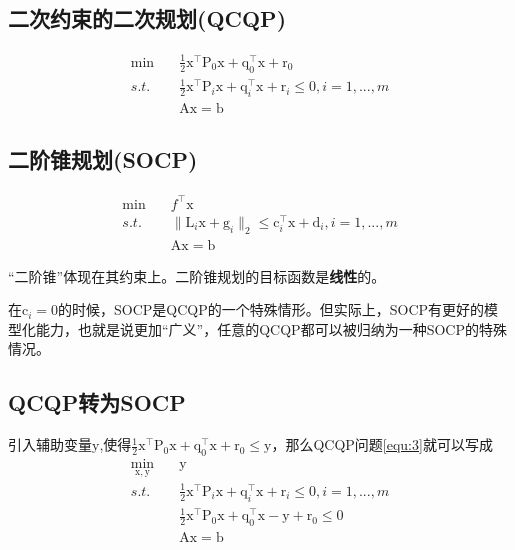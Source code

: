 \documentclass[a4paper]{D:/MyRepo/Script/latex/PaperReadingLog}
\begin{document}
\subsection{二次约束的二次规划(QCQP)}
\begin{equation}
    \label{equ:3}
    \begin{aligned}
        \min\quad&\frac{1}{2}\mathrm{x}^\top\mathrm{P}_0\mathrm{x}+\mathrm{q}_0^\top\mathrm{x}+\mathrm{r}_0\\
        s.t.\quad&\frac{1}{2}\mathrm{x}^\top\mathrm{P}_i\mathrm{x}+\mathrm{q}_i^\top\mathrm{x}+\mathrm{r}_i\le0,i=1,...,m\\
        &\mathrm{A}\mathrm{x}=\mathrm{b}
    \end{aligned}
\end{equation}

\subsection{二阶锥规划(SOCP)}
\begin{equation}
    \label{equ:4}
    \begin{aligned}
        \min\quad&f^\top \mathrm{x}\\
        s.t.\quad&\lVert \mathrm{L}_i\mathrm{x}+\mathrm{g}_i\lVert_2\le \mathrm{c}_i^\top\mathrm{x}+\mathrm{d}_i,i=1,...,m\\
        &\mathrm{A}\mathrm{x}=\mathrm{b}
    \end{aligned}
\end{equation}

``二阶锥''体现在其约束上。二阶锥规划的目标函数是\textbf{线性}的。

在$\mathrm{c}_i=0$的时候，SOCP是QCQP的一个特殊情形。但实际上，SOCP有更好的模型化能力，也就是说更加``广义''，任意的QCQP都可以被归纳为一种SOCP的特殊情况。

\subsection{QCQP转为SOCP}
引入辅助变量$\mathrm{y}$,使得$\frac{1}{2}\mathrm{x}^\top\mathrm{P}_0\mathrm{x}+\mathrm{q}_0^\top\mathrm{x}+\mathrm{r}_0\le\mathrm{y}$，那么QCQP问题\ref{equ:3}就可以写成
\begin{equation}
    \label{equ:5}
    \begin{aligned}
        \min_{\mathrm{x},\mathrm{y}}\quad&\mathrm{y}\\
        s.t.\quad&\frac{1}{2}\mathrm{x}^\top\mathrm{P}_i\mathrm{x}+\mathrm{q}_i^\top\mathrm{x}+\mathrm{r}_i\le0,i=1,...,m\\
        &\frac{1}{2}\mathrm{x}^\top\mathrm{P}_0\mathrm{x}+\mathrm{q}_0^\top\mathrm{x}-\mathrm{y}+\mathrm{r}_0\le0\\
        &\mathrm{A}\mathrm{x}=\mathrm{b}
    \end{aligned}
\end{equation}
\end{document}
